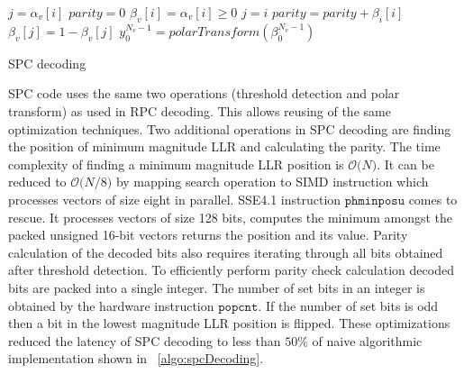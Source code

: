 \IncMargin{1.5em}
\begin{algorithm}[]
	 {
			$j = \alpha_{v}[i]$ \;
			$parity = 0$ \;
			 {
				$\beta_{v}[i] = \alpha_{v}[i] \ge 0$\;
				 {
					$j = i$ \;
				}
				$parity = parity + \beta_{\textit{i}}[i]$ \;
			}
		 {
			$\beta_{v}[j] = 1 - \beta_{v}[j]$\;
		}
		$y_{0}^{N_v-1} = polarTransform(\beta_{0}^{N_v-1})$ \;
		}
	\caption{SPC decoding}
	\label{algo:spcDecoding}
\end{algorithm}
\DecMargin{1.5em}

SPC code uses the same two operations (threshold detection and polar transform) as used in RPC decoding. This allows reusing of the same optimization techniques. Two additional operations in SPC decoding are finding the position of minimum magnitude LLR and calculating the parity. The time complexity of finding a minimum magnitude LLR position is $\mathcal{O}\big(N\big)$. It can be reduced to $\mathcal{O}\big(N/8\big)$ by mapping search operation to SIMD instruction which processes vectors of size eight in parallel. SSE4.1 instruction $\mathtt{phminposu}$ comes to rescue. It processes vectors of size 128 bits, computes the minimum amongst the packed unsigned 16-bit vectors returns the position and its value. Parity calculation of the decoded bits also requires iterating through all bits obtained after threshold detection. To efficiently perform parity check calculation decoded bits are packed into a single integer. The number of set bits in an integer is obtained by the hardware instruction $\mathtt{popcnt}$. If the number of set bits is odd then a bit in the lowest magnitude LLR position is flipped. These optimizations reduced the latency of SPC decoding to less than $50\%$ of naive algorithmic implementation shown in ~\ref{algo:spcDecoding}.

